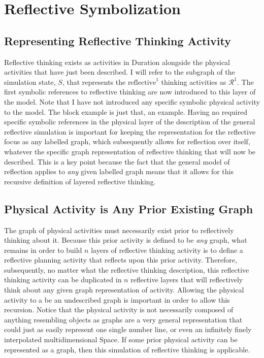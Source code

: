 \chapter{Reflective Symbolization}
\label{chapter:reflective_symbolization}

\section{Representing Reflective Thinking Activity}

Reflective thinking exists as activities in Duration alongside the
physical activities that have just been described.  I will refer to
the subgraph of the simulation state, $S$, that represents the
$\text{reflective}^1$ thinking activities as $\mathcal{R}^1$.  The
first symbolic references to reflective thinking are now introduced to
this layer of the model.  Note that I have not introduced any specific
symbolic physical activity to the model.  The block example is just
that, an example.  Having no required specific symbolic references in
the physical layer of the description of the general reflective
simulation is important for keeping the representation for the
reflective focus as any labelled graph, which subsequently allows for
reflection over itself, whatever the specific graph representation of
reflective thinking that will now be described.  This is a key point
because the fact that the general model of reflection applies to
\emph{any} given labelled graph means that it allows for this
recursive definition of layered reflective thinking.

\section{Physical Activity is Any Prior Existing Graph}

The graph of physical activities must necessarily exist prior to
reflectively thinking about it.  Because this prior activity is
defined to be \emph{any} graph, what remains in order to build $n$
layers of reflective thinking activity is to define a reflective
planning activity that reflects upon this prior activity.  Therefore,
subsequently, no matter what the reflective thinking description, this
reflective thinking activity can be duplicated in $n$ reflective
layers that will reflectively think about any given graph
representation of activity.  Allowing the physical activity to a be an
undescribed graph is important in order to allow this recursion.
Notice that the physical activity is not necessarily composed of
anything resembling objects as graphs are a very general
representation that could just as easily represent one single number
line, or even an infinitely finely interpolated multidimensional
Space.  If some prior physical activity can be represented as a graph,
then this simulation of reflective thinking is applicable.

